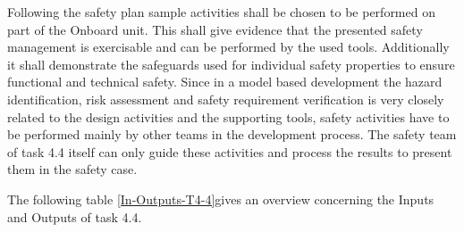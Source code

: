 Following the safety plan sample activities shall be chosen to be performed on part of the Onboard unit. This shall give evidence that the presented safety management is exercisable and can be performed by the used tools. Additionally it shall demonstrate the safeguards used for individual safety properties to ensure functional and technical safety. 
Since in a model based development the hazard identification, risk assessment and safety requirement verification is very closely related to the design activities and the supporting tools, safety activities have to be performed mainly by other teams in the development process. The safety team of task 4.4 itself can only guide these activities and process the results to present them in the safety case. 

The following table \ref{In-Outputs-T4-4}gives an overview concerning the Inputs and Outputs of task 4.4.




